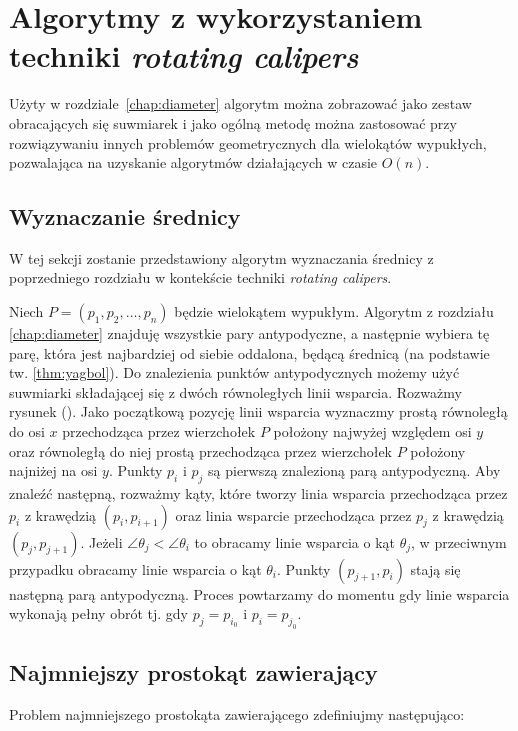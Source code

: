 \chapter{Algorytmy z wykorzystaniem techniki \emph{rotating calipers}}
Użyty w rozdziale~\ref{chap:diameter} algorytm można zobrazować jako
zestaw obracających się suwmiarek i jako ogólną metodę można
zastosować przy rozwiązywaniu innych problemów geometrycznych dla
wielokątów wypukłych, pozwalająca na uzyskanie algorytmów działających
w czasie $O(n)$.

\section{Wyznaczanie średnicy}
W tej sekcji zostanie przedstawiony algorytm wyznaczania średnicy z
poprzedniego rozdziału w kontekście techniki \emph{rotating calipers}.

Niech $P = (p_1, p_2, \ldots, p_n)$ będzie wielokątem
wypukłym. Algorytm z rozdziału \ref{chap:diameter} znajduję wszystkie
pary antypodyczne, a następnie wybiera tę parę, która jest najbardziej
od siebie oddalona, będącą średnicą (na podstawie
tw. \ref{thm:yagbol}). Do znalezienia punktów antypodycznych możemy
użyć suwmiarki składającej się z dwóch równoległych linii
wsparcia. Rozważmy rysunek (). Jako początkową pozycję linii wsparcia
wyznaczmy prostą równoległą do osi $x$ przechodząca przez wierzchołek
$P$ położony najwyżej względem osi $y$ oraz równoległą do niej prostą
przechodząca przez wierzchołek $P$ położony najniżej na osi
$y$. Punkty $p_i$ i $p_j$ są pierwszą znalezioną parą
antypodyczną. Aby znaleźć następną, rozważmy kąty, które tworzy linia
wsparcia przechodząca przez $p_i$ z krawędzią $(p_i, p_{i+1})$ oraz
linia wsparcie przechodząca przez $p_j$ z krawędzią $(p_j, p_{j+1})$.
Jeżeli $\angle{\theta_j} < \angle{\theta_i}$ to obracamy linie
wsparcia o kąt $\theta_j$, w przeciwnym przypadku obracamy linie
wsparcia o kąt $\theta_i$. Punkty $(p_{j+1}, p_i)$ stają się następną
parą antypodyczną. Proces powtarzamy do momentu gdy linie wsparcia
wykonają pełny obrót tj. gdy $p_j = p_{i_0}$ i $p_i = p_{j_0}$.



\section{Najmniejszy prostokąt zawierający}
Problem najmniejszego prostokąta zawierającego zdefiniujmy
następująco:

